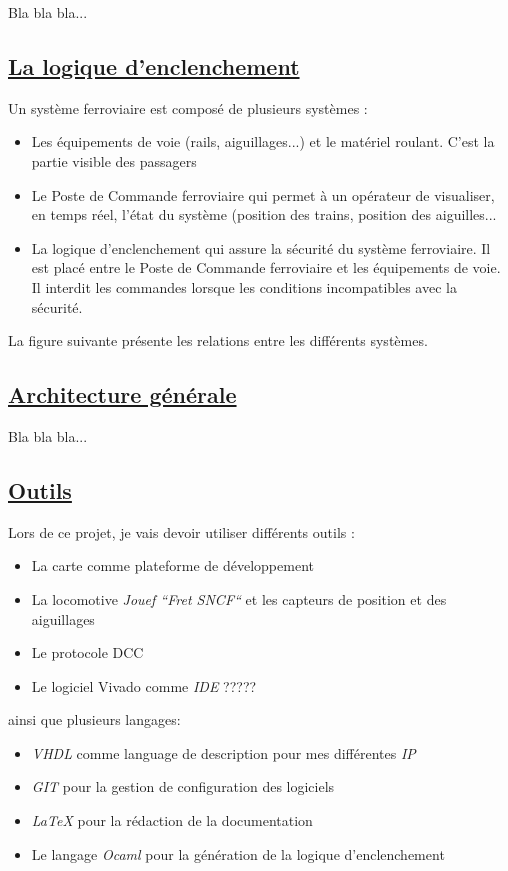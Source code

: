 Bla bla bla...

\subsection{\underline{ La logique d'enclenchement}}
\label{sec:log_ixl}

Un système ferroviaire est compos\'e de plusieurs systèmes :
\begin{itemize}
  \item Les \'equipements de voie (rails, aiguillages...) et le mat\'eriel
    roulant. C'est la partie visible des passagers
  \item Le Poste de Commande ferroviaire qui permet à un op\'erateur de
    visualiser, en temps r\'eel, l'\'etat du système (position des trains,
    position des aiguilles...
  \item La logique d'enclenchement qui assure la s\'ecurit\'e du système
    ferroviaire. Il est plac\'e entre le Poste de Commande ferroviaire
    et les \'equipements de voie. Il interdit les commandes lorsque les
    conditions incompatibles avec la s\'ecurit\'e. 
\end{itemize}

La figure suivante pr\'esente les relations entre les diff\'erents
systèmes.


\subsection{\underline{ Architecture g\'en\'erale}}
\label{sec:archi}
Bla bla bla...



\subsection{\underline{ Outils}}
\label{sec:outils}

Lors de ce projet, je vais devoir utiliser diff\'erents outils :
\begin{itemize}
  \item La carte \crt comme plateforme de d\'eveloppement
  \item La locomotive \emph{Jouef ``Fret SNCF``}\cite{Jouef}  et les capteurs de
    position et des aiguillages
  \item Le protocole DCC \cite{DCC}
  \item Le logiciel Vivado comme \emph{IDE} ?????
\end{itemize}

ainsi que plusieurs langages:
\begin{itemize}
  \item \emph{VHDL}\cite{VHDL} comme language de description pour mes diff\'erentes
    \emph{IP}
  \item \emph{GIT}\cite{GIT} pour la gestion de configuration des logiciels
  \item \emph{\LaTeX}\cite{LATEX} pour la r\'edaction de la documentation
  \item Le langage \emph{Ocaml}\cite{OCAML} pour la g\'en\'eration de la logique d'enclenchement
\end{itemize}


